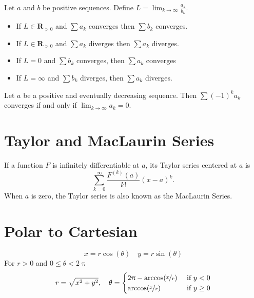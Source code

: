 \documentclass[letterpaper,landscape,9pt,fleqn]{extarticle}
\newcommand{\reals}{\mathbf{R}}
\begin{document}
\begin{multicols*}{2}
\begin{minipage}[c]{0.5\textwidth}

Let $a$ and $b$ be positive sequences. Define 
$L = \lim_{k \to \infty} \frac{a_k}{b_k}$.
\begin{itemize}[noitemsep]
    \item If $L \in \reals_{> 0}$ and $\sum a_k$ converges then  
    $\sum b_k$ converges.

    \item If $L \in \reals_{> 0}$ and $\sum a_k$ diverges then  
    $\sum a_k$ diverges.

    \item If $L = 0$ and $\sum b_k$  converges, then $\sum a_k $  converges
   
    \item If $L = \infty$ and $\sum b_k$ diverges, then $\sum a_k $ diverges.  
\end{itemize}

Let  $a$ be a positive and eventually decreasing sequence. 
Then $\sum (-1)^k a_k$ converges if and only if $\lim_{k \to \infty} a_k = 0$.

\end{minipage}



\vspace{0.125in}
\section*{Taylor and MacLaurin Series}
\vspace{0.25in}
If a function $F$ is infinitely differentiable at $a$, its Taylor series centered at $a$ is
\begin{equation*}
  \sum_{k=0}^\infty \frac{F^{(k)}(a)}{k!}  (x-a)^k.
\end{equation*}
When $a$ is zero, the Taylor series is also known as the MacLaurin Series.
\vspace{0.1in}
\section*{Polar to Cartesian}
\begin{minipage}[c]{0.5\textwidth}
\begin{equation*}
x = r \cos(\theta) \quad y = r \sin(\theta)
\end{equation*}
For $r > 0$ and $0 \leq \theta < 2 \uppi$
\begin{equation*}
r = \sqrt{x^2 + y^2} ,\quad 
\theta = \begin{cases} 2 \uppi - \arccos(\nicefrac{x}{r})  & \mbox{ if } y < 0  \\
  \arccos(\nicefrac{x}{r})  & \mbox{ if } y \geq 0 
             \end{cases}    
\end{equation*}
\end{minipage}      


\end{multicols*}
\end{document}
